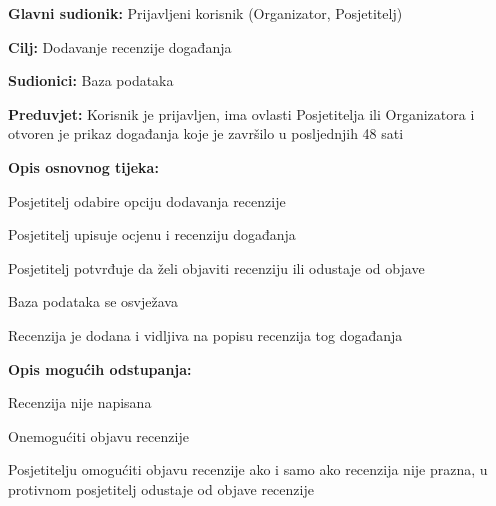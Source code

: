 	
	\noindent {}
	\begin{packed_item}
		
		\item \textbf{Glavni sudionik:} Prijavljeni korisnik (Organizator, Posjetitelj)
		\item  \textbf{Cilj:} Dodavanje recenzije događanja
		\item  \textbf{Sudionici:} Baza podataka
		\item  \textbf{Preduvjet:} Korisnik je prijavljen, ima ovlasti Posjetitelja ili Organizatora i otvoren je prikaz događanja koje je završilo u posljednjih 48 sati
		\item  \textbf{Opis osnovnog tijeka:}
		
		\item[] \begin{packed_enum}
			
			\item Posjetitelj odabire opciju dodavanja recenzije
			\item Posjetitelj upisuje ocjenu i recenziju događanja
			\item Posjetitelj potvrđuje da želi objaviti recenziju ili odustaje od objave
			\item Baza podataka se osvježava
			\item Recenzija je dodana i vidljiva na popisu recenzija tog događanja
			
		\end{packed_enum}
		
		\item  \textbf{Opis mogućih odstupanja:}
		
		\item[] \begin{packed_item}
			
			\item[2.a] Recenzija nije napisana 
			\item[] \begin{packed_enum}
				
				\item Onemogućiti objavu recenzije 
				\item Posjetitelju omogućiti objavu recenzije ako i samo ako recenzija nije prazna, u protivnom posjetitelj odustaje od objave recenzije
				
			\end{packed_enum}		
		\end{packed_item}
		
	\end{packed_item}
	
